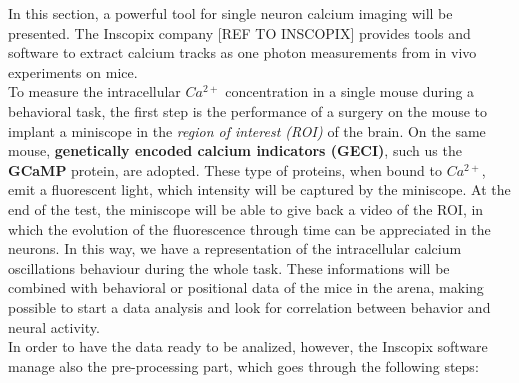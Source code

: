 \documentclass[a4paper]{article}
\begin{document}
In this section, a powerful tool for single neuron calcium imaging will be presented. The Inscopix company [REF TO INSCOPIX] provides tools and software to extract calcium tracks as one photon measurements from in vivo experiments on mice.\\
To measure the intracellular $Ca^{2+}$ concentration in a single mouse during a behavioral task, the first step is the performance of a surgery on the mouse to implant a miniscope in the \textit{region of interest (ROI)} of the brain. On the same mouse, \textbf{genetically encoded calcium indicators (GECI)}, such us the \textbf{GCaMP} protein, are adopted. These type of proteins, when bound to $Ca^{2+}$, emit a fluorescent light, which intensity will be captured by the miniscope. At the end of the test, the miniscope will be able to give back a video of the ROI, in which the evolution of the fluorescence through time can be appreciated  in the neurons. In this way, we have a representation of the intracellular calcium oscillations behaviour during the whole task. These informations will be combined with behavioral or positional data of the mice in the arena, making possible to start a data analysis and look for correlation between behavior and neural activity.\\
In order to have the data ready to be analized, however, the Inscopix software manage also the pre-processing part, which goes through the following steps:
\end{document}
